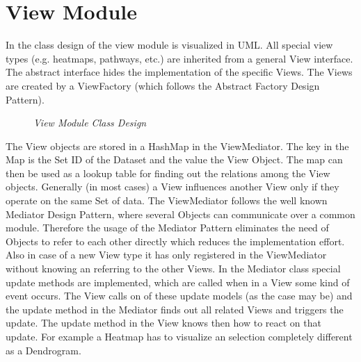 \section{View Module}

In  the class design of the view module is visualized in UML.
All special view types (e.g. heatmaps, pathways, etc.) are inherited from a general View interface.
The abstract interface hides the implementation of the specific Views.
The Views are created by a ViewFactory (which follows the Abstract Factory Design Pattern).

\begin{figure}[ht]
\centering
{} 
\caption[View Module Class Design]{\textit{View Module Class Design}} 
\label{gfx:view_module_class_design}
\end{figure}

The View objects are stored in a HashMap in the ViewMediator. The key in the Map is the Set ID of the Dataset and the value the View Object. The map can then be used as a lookup table for finding out the relations among the View objects. Generally (in most cases) a View influences another View only if they operate on the same Set of data. 
The ViewMediator follows the well known Mediator Design Pattern, where several Objects can communicate over a common module.
Therefore the usage of the Mediator Pattern eliminates the need of Objects to refer to each other directly which reduces the implementation effort. Also in case of a new View type it has only registered in the ViewMediator without knowing an referring to the other Views. In the Mediator class special update methods are implemented, which are called when in a View some kind of event occurs. The View calls on of these update models (as the case may be) and the update method in the Mediator finds out all related Views and triggers the update. The update method in the View knows then how to react on that update. For example a Heatmap has to visualize an selection completely different as a Dendrogram.

